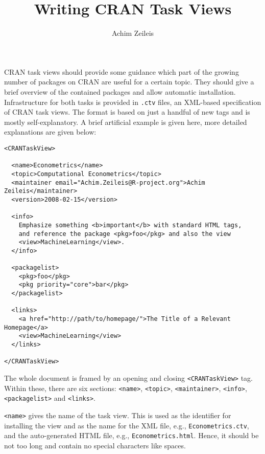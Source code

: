 \documentclass[a4paper]{article}
\begin{document}

\title{Writing CRAN Task Views}
\author{Achim Zeileis}
\date{}
\maketitle

CRAN task views should provide some guidance which part
of the growing number of packages on CRAN are useful for
a certain topic. They should give a brief overview of the
contained packages and allow automatic installation. Infrastructure
for both tasks is provided in \verb/.ctv/ files, an XML-based
specification of CRAN task views. The format is based on just
a handful of new tags and is mostly self-explanatory. A brief
artificial example is given here, more detailed explanations
are given below:

\begin{verbatim}
<CRANTaskView>

  <name>Econometrics</name>
  <topic>Computational Econometrics</topic>
  <maintainer email="Achim.Zeileis@R-project.org">Achim Zeileis</maintainer>
  <version>2008-02-15</version>

  <info>
    Emphasize something <b>important</b> with standard HTML tags,
    and reference the package <pkg>foo</pkg> and also the view
    <view>MachineLearning</view>.
  </info>

  <packagelist>
    <pkg>foo</pkg>
    <pkg priority="core">bar</pkg>
  </packagelist>

  <links>
    <a href="http://path/to/homepage/">The Title of a Relevant Homepage</a>
    <view>MachineLearning</view>
  </links>

</CRANTaskView>
\end{verbatim}

The whole document is framed by an opening and closing \verb/<CRANTaskView>/
tag. Within these, there are six sections: \verb/<name>/, \verb/<topic>/,
\verb/<maintainer>/, \verb/<info>/, \verb/<packagelist>/ and \verb/<links>/.

\verb/<name>/ gives the name of the task view. This is used as the identifier
for installing the view and as the name for the XML file, e.g., \verb/Econometrics.ctv/,
and the auto-generated HTML file, e.g., \verb/Econometrics.html/. Hence, it should be
not too long and contain no special characters like spaces.
\end{document}
